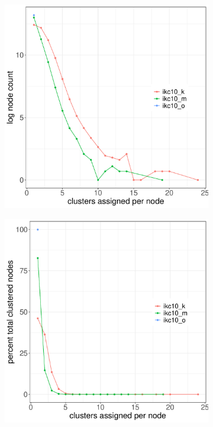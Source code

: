 \documentclass[11pt, oneside]{article}   	%
\begin{document}
\begin{figure}[H]
	\centering
	\begin{subfigure}[t]{0.48\textwidth}
	 \centering
	 \includegraphics[width=\linewidth]{fig2a.pdf} 
	 \end{subfigure}
 \hfill
	\begin{subfigure}[t]{0.48\textwidth}
        \centering
        \includegraphics[width=\linewidth]{fig2b.pdf} 

\end{subfigure}
\end{figure}
\end{document}
